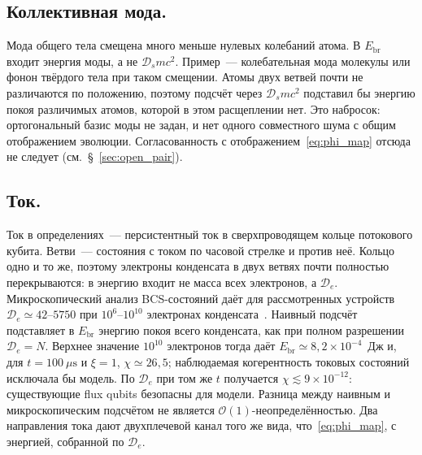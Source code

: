\documentclass[12pt,a4paper]{article}
\begin{document}
\subsection{Коллективная мода.}
Мода общего тела смещена много меньше нулевых колебаний атома. В $E_{\mathrm{br}}$ входит энергия моды, а не $\mathcal D_s mc^2$. Пример~--- колебательная мода молекулы или фонон твёрдого тела при таком смещении. Атомы двух ветвей почти не различаются по положению, поэтому подсчёт через $\mathcal D_s mc^2$ подставил бы энергию покоя различимых атомов, которой в этом расщеплении нет. Это набросок: ортогональный базис моды не задан, и нет одного совместного шума с общим отображением эволюции. Согласованность с отображением~\eqref{eq:phi_map} отсюда не следует (см.~\S~\ref{sec:open_pair}).

\subsection{Ток.}
\label{sec:many_body}
Ток в определениях~--- персистентный ток в сверхпроводящем кольце потокового кубита. Ветви~--- состояния с током по часовой стрелке и против неё. Кольцо одно и то же, поэтому электроны конденсата в двух ветвях почти полностью перекрываются: в энергию входит не масса всех электронов, а $\mathcal D_e$. Микроскопический анализ BCS-состояний даёт для рассмотренных устройств $\mathcal D_e\simeq42$--$5750$ при $10^6$--$10^{10}$ электронах конденсата~\cite{korsbakken2009,korsbakken2010}. Наивный подсчёт подставляет в $E_{\mathrm{br}}$ энергию покоя всего конденсата, как при полном разрешении $\mathcal D_e=N$. Верхнее значение $10^{10}$ электронов тогда даёт $E_{\mathrm{br}}\simeq8{,}2\times10^{-4}$~Дж и, для $t=100~\mu\mathrm{s}$ и $\xi=1$, $\chi\simeq26{,}5$; наблюдаемая когерентность токовых состояний исключала бы модель. По $\mathcal D_e$ при том же $t$ получается $\chi\lesssim9\times10^{-12}$: существующие flux qubits безопасны для модели. Разница между наивным и микроскопическим подсчётом не является $\mathcal O(1)$-неопределённостью. Два направления тока дают двухплечевой канал того же вида, что~\eqref{eq:phi_map}, с энергией, собранной по $\mathcal D_e$.
\end{document}
